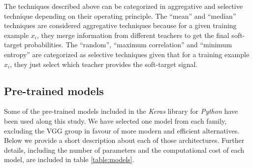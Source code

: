 \documentclass{elsarticle}
\begin{document}
	The techniques described above can be categorized in aggregative and selective technique depending on their operating principle. The ``mean'' and ``median'' techniques are considered aggregative techniques because for a given training example $x_i$, they merge information from different teachers to get the final soft-target probabilities. The ``random'', ``maximum correlation'' and ``minimum entropy'' are categorized as selective techniques given that for a training example $x_i$, they just select which teacher provides the soft-target signal.  
 
    \subsection{Pre-trained models}
    Some of the pre-trained models included in the \textit{Keras} library for \textit{Python} \citep{chollet2015keras} have been used along this study. We have selected one model from each family, excluding the VGG group in favour of more modern and efficient alternatives. Below we provide a short description about each of those architectures. Further details, including the number of parameters and the computational cost of each model, are included in table \ref{table:models}.
\end{document}
